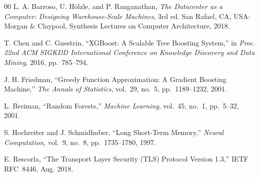 \documentclass[conference]{IEEEtran}
\begin{document}
\begin{thebibliography}{00}
 L. A. Barroso, U. H\"olzle, and P. Ranganathan, \emph{The Datacenter
as a Computer: Designing Warehouse-Scale Machines}, 3rd ed. San Rafael, CA, USA: Morgan \& Claypool,
Synthesis Lectures on Computer Architecture, 2018.

 T. Chen and C. Guestrin, ``XGBoost: A Scalable Tree Boosting System,'' in
\emph{Proc. 22nd ACM SIGKDD International Conference on Knowledge Discovery and Data Mining}, 2016,
pp.~785--794.

 J. H. Friedman, ``Greedy Function Approximation: A Gradient Boosting
Machine,'' \emph{The Annals of Statistics}, vol.~29, no.~5, pp.~1189--1232, 2001.

 L. Breiman, ``Random Forests,'' \emph{Machine Learning}, vol.~45,
no.~1, pp.~5--32, 2001.

 S. Hochreiter and J. Schmidhuber, ``Long Short-Term Memory,'' \emph{Neural
Computation}, vol.~9, no.~8, pp.~1735--1780, 1997.

 E. Rescorla, ``The Transport Layer Security (TLS) Protocol Version 1.3,''
IETF RFC~8446, Aug. 2018.

\end{thebibliography}
\end{document}
